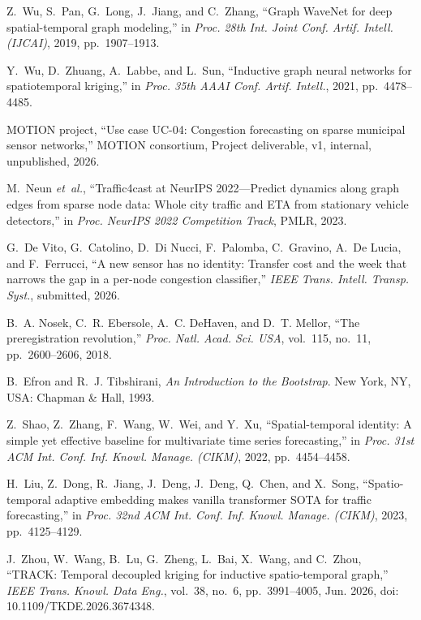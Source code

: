 Z.~Wu, S.~Pan, G.~Long, J.~Jiang, and C.~Zhang, ``Graph WaveNet for deep spatial-temporal graph modeling,'' in \emph{Proc. 28th Int. Joint Conf. Artif. Intell. (IJCAI)}, 2019, pp.~1907--1913.

Y.~Wu, D.~Zhuang, A.~Labbe, and L.~Sun, ``Inductive graph neural networks for spatiotemporal kriging,'' in \emph{Proc. 35th AAAI Conf. Artif. Intell.}, 2021, pp.~4478--4485.

MOTION project, ``Use case UC-04: Congestion forecasting on sparse municipal sensor networks,'' MOTION consortium, Project deliverable, v1, internal, unpublished, 2026.

M.~Neun \emph{et~al.}, ``Traffic4cast at NeurIPS 2022---Predict dynamics along graph edges from sparse node data: Whole city traffic and ETA from stationary vehicle detectors,'' in \emph{Proc. NeurIPS 2022 Competition Track}, PMLR, 2023.

G.~De Vito, G.~Catolino, D.~Di Nucci, F.~Palomba, C.~Gravino, A.~De Lucia, and F.~Ferrucci, ``A new sensor has no identity: Transfer cost and the week that narrows the gap in a per-node congestion classifier,'' \emph{IEEE Trans. Intell. Transp. Syst.}, submitted, 2026.

B.~A. Nosek, C.~R. Ebersole, A.~C. DeHaven, and D.~T. Mellor, ``The preregistration revolution,'' \emph{Proc. Natl. Acad. Sci. USA}, vol.~115, no.~11, pp.~2600--2606, 2018.

B.~Efron and R.~J. Tibshirani, \emph{An Introduction to the Bootstrap}. New York, NY, USA: Chapman \& Hall, 1993.

Z.~Shao, Z.~Zhang, F.~Wang, W.~Wei, and Y.~Xu, ``Spatial-temporal identity: A simple yet effective baseline for multivariate time series forecasting,'' in \emph{Proc. 31st ACM Int. Conf. Inf. Knowl. Manage. (CIKM)}, 2022, pp.~4454--4458.

H.~Liu, Z.~Dong, R.~Jiang, J.~Deng, J.~Deng, Q.~Chen, and X.~Song, ``Spatio-temporal adaptive embedding makes vanilla transformer SOTA for traffic forecasting,'' in \emph{Proc. 32nd ACM Int. Conf. Inf. Knowl. Manage. (CIKM)}, 2023, pp.~4125--4129.

J.~Zhou, W.~Wang, B.~Lu, G.~Zheng, L.~Bai, X.~Wang, and C.~Zhou, ``TRACK: Temporal decoupled kriging for inductive spatio-temporal graph,'' \emph{IEEE Trans. Knowl. Data Eng.}, vol.~38, no.~6, pp.~3991--4005, Jun. 2026, doi: 10.1109/TKDE.2026.3674348.

